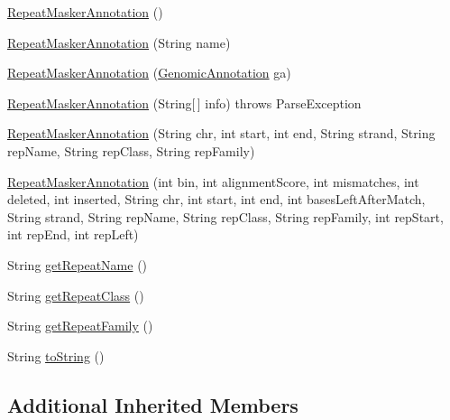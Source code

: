 \begin{DoxyCompactItemize}
\item 
\hyperlink{classbroad_1_1core_1_1annotation_1_1_repeat_masker_annotation_ac020f98188360a74407bfc76058345ab}{Repeat\+Masker\+Annotation} ()
\item 
\hyperlink{classbroad_1_1core_1_1annotation_1_1_repeat_masker_annotation_aeb351a6dfe1fa7cd65daa2040b7efa5b}{Repeat\+Masker\+Annotation} (String name)
\item 
\hyperlink{classbroad_1_1core_1_1annotation_1_1_repeat_masker_annotation_a39ef18b68f642134120998cce1f7a4b4}{Repeat\+Masker\+Annotation} (\hyperlink{interfacebroad_1_1core_1_1annotation_1_1_genomic_annotation}{Genomic\+Annotation} ga)
\item 
\hyperlink{classbroad_1_1core_1_1annotation_1_1_repeat_masker_annotation_aacaf139257b4dd1b4485e76141027df5}{Repeat\+Masker\+Annotation} (String\mbox{[}$\,$\mbox{]} info)  throws Parse\+Exception 
\item 
\hyperlink{classbroad_1_1core_1_1annotation_1_1_repeat_masker_annotation_a736e01cbf1ae76e923f3888e2f460b23}{Repeat\+Masker\+Annotation} (String chr, int start, int end, String strand, String rep\+Name, String rep\+Class, String rep\+Family)
\item 
\hyperlink{classbroad_1_1core_1_1annotation_1_1_repeat_masker_annotation_a035cdeaa2a45ff175997c27442a01bc5}{Repeat\+Masker\+Annotation} (int bin, int alignment\+Score, int mismatches, int deleted, int inserted, String chr, int start, int end, int bases\+Left\+After\+Match, String strand, String rep\+Name, String rep\+Class, String rep\+Family, int rep\+Start, int rep\+End, int rep\+Left)
\item 
String \hyperlink{classbroad_1_1core_1_1annotation_1_1_repeat_masker_annotation_aa6caca9cc5147ba8badb8d98276ba919}{get\+Repeat\+Name} ()
\item 
String \hyperlink{classbroad_1_1core_1_1annotation_1_1_repeat_masker_annotation_a5d76873dcfe380e8e7fe5e5a41dbc313}{get\+Repeat\+Class} ()
\item 
String \hyperlink{classbroad_1_1core_1_1annotation_1_1_repeat_masker_annotation_a61fc73a94c83c7665240a71192fd9af4}{get\+Repeat\+Family} ()
\item 
String \hyperlink{classbroad_1_1core_1_1annotation_1_1_repeat_masker_annotation_a788542c30b1a5737f23fd170f7247cd3}{to\+String} ()
\end{DoxyCompactItemize}
\subsection*{Additional Inherited Members}



